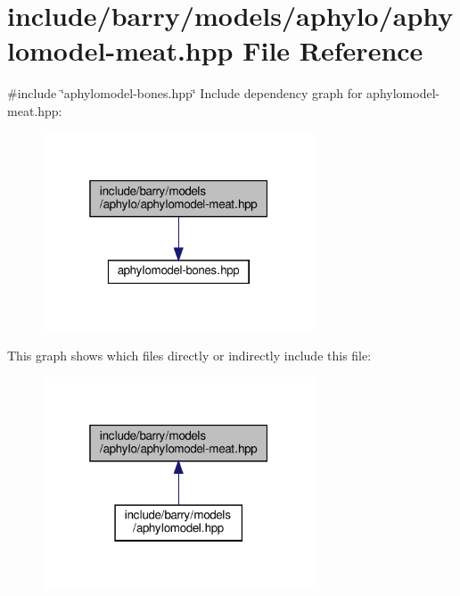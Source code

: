 \hypertarget{aphylomodel-meat_8hpp}{}\section{include/barry/models/aphylo/aphylomodel-\/meat.hpp File Reference}
\label{aphylomodel-meat_8hpp}
{\ttfamily \#include \char`\"{}aphylomodel-\/bones.\+hpp\char`\"{}}\newline
Include dependency graph for aphylomodel-\/meat.hpp\+:
\nopagebreak
\begin{figure}[H]
\begin{center}
\leavevmode
\includegraphics[width=229pt]{aphylomodel-meat_8hpp__incl}
\end{center}
\end{figure}
This graph shows which files directly or indirectly include this file\+:
\nopagebreak
\begin{figure}[H]
\begin{center}
\leavevmode
\includegraphics[width=229pt]{aphylomodel-meat_8hpp__dep__incl}
\end{center}
\end{figure}
